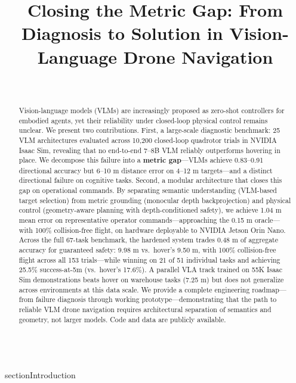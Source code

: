 \documentclass[conference]{IEEEtran}
\begin{document}
\title{Closing the Metric Gap: From Diagnosis to Solution in Vision-Language Drone Navigation}

\author{\\
}

\maketitle

\begin{abstract}
Vision-language models (VLMs) are increasingly proposed as
zero-shot controllers for embodied agents, yet their reliability under
closed-loop physical control remains unclear. We present two
contributions. First, a large-scale diagnostic benchmark: 25 VLM
architectures evaluated across 10,200 closed-loop quadrotor trials in
NVIDIA Isaac Sim, revealing that no end-to-end 7--8B VLM reliably
outperforms hovering in place. We decompose this failure into a
\textbf{metric gap}---VLMs achieve 0.83--0.91 directional accuracy but
6--10 m distance error on 4--12 m targets---and a distinct directional
failure on cognitive tasks. Second, a modular architecture that closes
this gap on operational commands. By separating semantic understanding
(VLM-based target selection) from metric grounding (monocular depth
backprojection) and physical control (geometry-aware planning with
depth-conditioned safety), we achieve 1.04 m mean error on
representative operator commands---approaching the 0.15 m oracle---with
100\% collision-free flight, on hardware deployable to NVIDIA Jetson
Orin Nano. Across the full 67-task benchmark, the hardened system trades
0.48 m of aggregate accuracy for guaranteed safety: 9.98 m vs.~hover's
9.50 m, with 100\% collision-free flight across all 153 trials---while
winning on 21 of 51 individual tasks and achieving 25.5\% success-at-5m
(vs.~hover's 17.6\%). A parallel VLA track trained on 55K Isaac Sim
demonstrations beats hover on warehouse tasks (7.25 m) but does not
generalize across environments at this data scale. We provide a complete
engineering roadmap---from failure diagnosis through working
prototype---demonstrating that the path to reliable VLM drone navigation
requires architectural separation of semantics and geometry, not larger
models. Code and data are publicly available.
\end{abstract}

\\section{Introduction}\label{i.-introduction}
\end{document}
